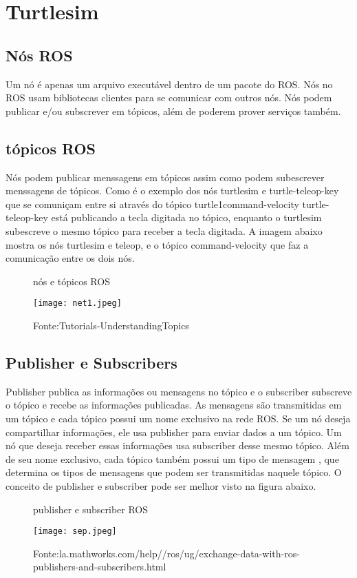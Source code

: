 \section{Turtlesim}
\subsection{Nós ROS}
Um nó é apenas um arquivo executável dentro de um pacote do ROS. Nós no ROS usam bibliotecas clientes para se comunicar com outros nós.
Nós podem publicar e/ou subscrever em tópicos, além de poderem prover serviços também.
\subsection{tópicos ROS}
Nós podem publicar menssagens em tópicos assim como podem subescrever menssagens de tópicos.
Como é o exemplo dos nós turtlesim e turtle-teleop-key que se comuniçam entre si através do tópico turtle1command-velocity
turtle-teleop-key está publicando a tecla digitada no tópico, enquanto o turtlesim subescreve o mesmo tópico para receber a tecla digitada. 
A imagem abaixo mostra os nós turtlesim e teleop, e o tópico command-velocity que faz a comunicação entre os dois nós.

\begin{figure} [h!]	
   \centering
   \caption{nós e tópicos ROS}
   \texttt{[image: net1.jpeg]}
   \caption*{Fonte:Tutorials-UnderstandingTopics}
   \label{fig:nosetopicos}
\end{figure}	
\subsection{Publisher e Subscribers}
Publisher publica as informações ou mensagens no tópico e o subscriber subscreve o tópico e recebe as informações publicadas.
As mensagens são transmitidas em um tópico e cada tópico possui um nome exclusivo na rede ROS. Se um nó deseja compartilhar informações,
ele usa publisher para enviar dados a um tópico. Um nó que deseja receber essas informações usa subscriber desse mesmo tópico. 
Além de seu nome exclusivo, cada tópico também possui um tipo de mensagem , que determina os tipos de mensagens que podem ser transmitidas naquele tópico.
O conceito de publisher e subscriber pode ser melhor visto na figura abaixo.
\begin{figure} [h!]	
   \centering
   \caption{publisher e subscriber ROS}
   \texttt{[image: sep.jpeg]}
   \caption*{Fonte:la.mathworks.com/help//ros/ug/exchange-data-with-ros-publishers-and-subscribers.html}
   \label{fig:publisheresubscriber}
\end{figure}	
